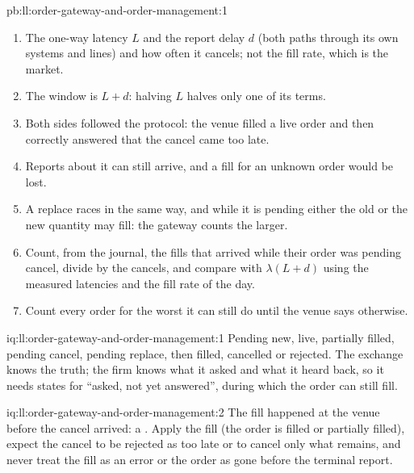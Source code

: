 \begin{solution}{pb:ll:order-gateway-and-order-management:1}
\begin{enumerate}
order resting longer than $L + d$ (2.4\% at \qty{100}{\micro\second}, 200 fills a second and \qty{20}{\micro\second} of report
delay); without in-flight accounting, each race can put one more order's quantity on the position, beyond the limit.
\item The one-way latency $L$ and the report delay $d$ (both paths through its own systems and lines) and how often it cancels;
not the fill rate, which is the market.
\item The window is $L + d$: halving $L$ halves only one of its terms.
\item Both sides followed the protocol: the venue filled a live order and then correctly answered that the cancel came too
late.
\item Reports about it can still arrive, and a fill for an unknown order would be lost.
\item A replace races in the same way, and while it is pending either the old or the new quantity may fill: the gateway counts
the larger.
\item Count, from the journal, the fills that arrived while their order was pending cancel, divide by the cancels, and compare
with $\lambda (L + d)$ using the measured latencies and the fill rate of the day.
\item Count every order for the worst it can still do until the venue says otherwise.
\end{enumerate}
\end{solution}

\begin{solution}{iq:ll:order-gateway-and-order-management:1}
Pending new, live, partially filled, pending cancel, pending replace, then filled, cancelled or rejected. The exchange knows the
truth; the firm knows what it asked and what it heard back, so it needs states for ``asked, not yet answered'', during which
the order can still fill.
\end{solution}

\begin{solution}{iq:ll:order-gateway-and-order-management:2}
The fill happened at the venue before the cancel arrived: a . Apply the fill (the order is filled or
partially filled), expect the cancel to be rejected as too late or to cancel only what remains, and never treat the fill as an
error or the order as gone before the terminal report.
\end{solution}


